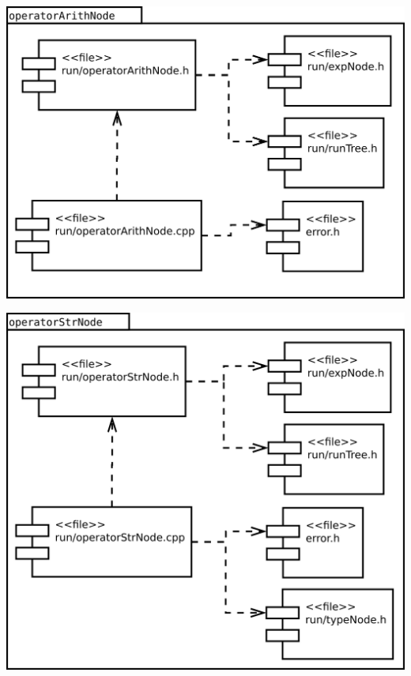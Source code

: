 \begin{multicols}{2}
\begin{center}
\includegraphics[scale=0.3]{files_arquitecture/operatorArithNode.png} \\
\end{center}
\begin{center}
\includegraphics[scale=0.3]{files_arquitecture/operatorStrNode.png} \\
\end{center}
\end{multicols}


